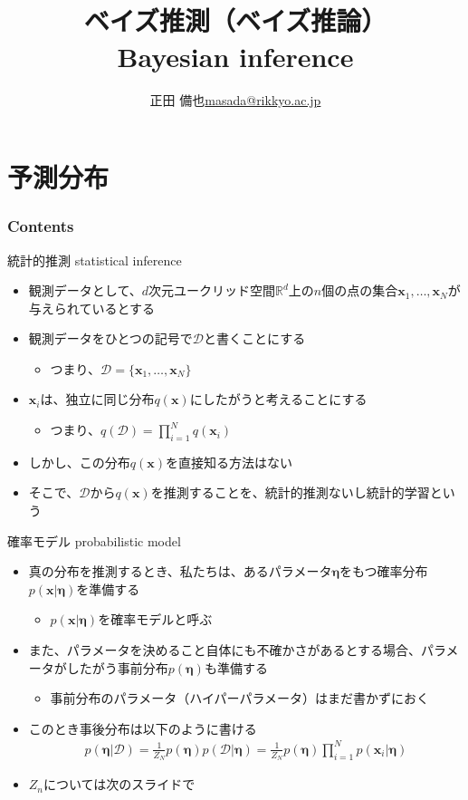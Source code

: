 \documentclass[aspectratio=169,unicode,dvipdfmx,14pt]{beamer}
\title{ \\ベイズ推測（ベイズ推論）\\ Bayesian inference}
\author{\texorpdfstring{正田 備也\newline\href{mailto:masada@rikkyo.ac.jp}{masada@rikkyo.ac.jp}}{正田 備也}}
\date{}
\begin{document}
\begin{frame}
\titlepage
\end{frame}

\section{予測分布}

\begin{frame}\frametitle{Contents}
\Large \tableofcontents[currentsection]
\end{frame}

\begin{frame}{統計的推測 statistical inference}
\begin{itemize}
\item 観測データとして、$d$次元ユークリッド空間$\mathbb{R}^d$上の$n$個の点の集合$\bm{x}_1,\ldots,\bm{x}_N$が与えられているとする
\item 観測データをひとつの記号で$\mathcal{D}$と書くことにする
\begin{itemize}
\item つまり、$\mathcal{D}=\{ \bm{x}_1,\ldots,\bm{x}_N \}$
\end{itemize}
\item $\bm{x}_i$は、独立に同じ分布$q(\bm{x})$にしたがうと考えることにする
\begin{itemize}
\item つまり、$q(\mathcal{D}) = \prod_{i=1}^N q(\bm{x}_i)$
\end{itemize}
\item しかし、この分布$q(\bm{x})$を直接知る方法はない
\item そこで、$\mathcal{D}$から$q(\bm{x})$を推測することを、統計的推測ないし統計的学習という
\end{itemize}
\end{frame}

\begin{frame}{確率モデル probabilistic model}
\begin{itemize}
\item 真の分布を推測するとき、私たちは、あるパラメータ$\bm{\eta}$をもつ確率分布$p(\bm{x}|\bm{\eta})$を準備する
\begin{itemize}
\item $p(\bm{x}|\bm{\eta})$を確率モデルと呼ぶ
\end{itemize}
\item また、パラメータを決めること自体にも不確かさがあるとする場合、パラメータがしたがう事前分布$p(\bm{\eta})$も準備する
\begin{itemize}
\item 事前分布のパラメータ（ハイパーパラメータ）はまだ書かずにおく
\end{itemize}
\item このとき事後分布は以下のように書ける
\begin{align}
p(\bm{\eta} | \mathcal{D}) = \frac{1}{Z_N} p(\bm{\eta}) p(\mathcal{D}|\bm{\eta})
= \frac{1}{Z_N} p(\bm{\eta}) \prod_{i=1}^N p(\bm{x}_i | \bm{\eta})
\label{eq:posterior}
\end{align}
\item $Z_n$については次のスライドで
\end{itemize}
\end{frame}
\end{document}
